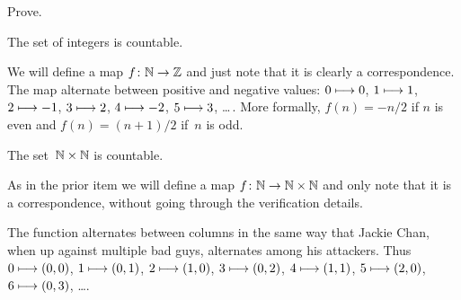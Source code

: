 \begin{problem}  \label{ex:IntegersCountable}
Prove.
\begin{exes}
\begin{exercise} 
  The set of integers is countable.
\end{exercise}
\begin{answer}
  We will define a map $\mbox{$f\colon \mathbb{N}\to \mathbb{Z}$}$ and just note that it is clearly a 
  correspondence.
  The map alternate between positive and negative values:
  $0\stackrel{}{\longmapsto}0$, $1\stackrel{}{\longmapsto}1$, $2\stackrel{}{\longmapsto}-1$, 
  $3\stackrel{}{\longmapsto}2$, $4\stackrel{}{\longmapsto}-2$, $5\stackrel{}{\longmapsto}3$, \ldots\,.
  More formally, $f(n)=-n/2$ if $n$ is even and $f(n)=(n+1)/2$ if~$n$ is odd.   
\end{answer}
\begin{exercise} 
  The set~$\mathbb{N}\times\mathbb{N}$ is countable.
\end{exercise}
\begin{answer}
  As in the prior item we will define a map
  $\mbox{$f\colon \mathbb{N}\to \mathbb{N}\times\mathbb{N}$}$ and only note that it is a correspondence, 
  without going through the verification details.
  
  The function alternates between columns in the same way that
  Jackie Chan, when up against multiple bad guys, alternates among his 
  attackers.
  Thus $0\stackrel{}{\longmapsto} (0,0)$, $1\stackrel{}{\longmapsto}(0,1)$, $2\stackrel{}{\longmapsto}(1,0)$, 
  $3\stackrel{}{\longmapsto}(0,2)$, 
  $4\stackrel{}{\longmapsto}(1,1)$, $5\stackrel{}{\longmapsto}(2,0)$, $6\stackrel{}{\longmapsto}(0,3)$, \ldots. 


\end{answer}
\end{exes}
\end{problem}
